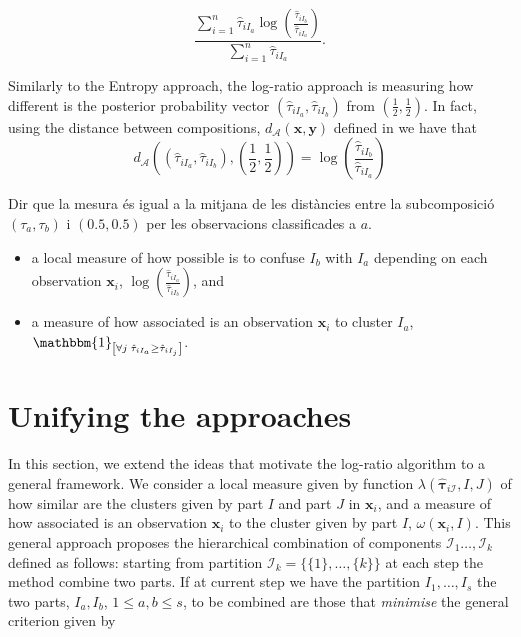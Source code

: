\documentclass[10pt, a4paper]{article}
\newcommand{\m}[1]{\boldsymbol{#1}}
\begin{document}
\[
\frac{\sum_{i=1}^n  \hat{\tau}_{iI_a}  \log( \frac{ \hat{\tau}_{iI_b} }{ \hat{\tau}_{iI_a} })}{\sum_{i=1}^n  \hat{\tau}_{iI_a} }.
\]

Similarly to the Entropy approach, the log-ratio approach is measuring how different is the posterior probability vector $(\hat{\tau}_{iI_a}, \hat{\tau}_{iI_b})$ from $(\frac{1}{2}, \frac{1}{2})$. In fact, using the distance between compositions, $d_{\mathcal{A}}(\m x,\m y)$ defined in \citep{aitchison1986statistical} we have that
\[
d_{\mathcal{A}}\left((\hat{\tau}_{iI_a}, \hat{\tau}_{iI_b}), (\frac{1}{2}, \frac{1}{2})\right) = \log( \frac{ \hat{\tau}_{iI_b} }{ \hat{\tau}_{iI_a} })
\]





{\color{red} Dir que la mesura és igual a la mitjana de les distàncies entre la subcomposició $(\tau_a, \tau_b)$ i $(0.5,0.5)$ per les observacions classificades a $a$.}

\begin{itemize}
\item a local measure of how possible is to confuse $I_b$ with $I_a$ depending on each observation $\m x_i$, $\log( \frac{ \hat{\tau}_{iI_a} }{ \hat{\tau}_{iI_b} })$, and
\item a measure of how associated is an observation $\m x_i$ to cluster $I_a$, $\mathbbm{1}_{\left[ \forall j\; \hat{\tau}_{i I_{a}} \geq \hat{\tau}_{iI_j} \right]}$.
\end{itemize}

\section{Unifying the approaches}
\label{confusion}


In this section, we extend the ideas that motivate the log-ratio algorithm to a general framework. We consider a local measure given by function $\lambda(\hat{\m\tau}_{i \mathcal{I}}, I, J)$ of how similar are the clusters given by part $I$ and part $J$ in $\m x_i$, and a measure of how associated is an observation $\m x_i$ to the cluster given by part $I$, $\omega(\m x_i, I)$. This general approach proposes the hierarchical combination of components $\mathcal{I}_1 \dots, \mathcal{I}_k$ defined as follows: starting from partition $\mathcal{I}_k = \{\{1\},\dots, \{k\}\}$ at each step the method combine two parts. If at current step we have the partition  $I_1, \dots, I_s$ the two parts, $I_a, I_b$, $1 \leq a,b \leq s$,  to be combined are those that \emph{minimise} the general criterion given by
\end{document}
